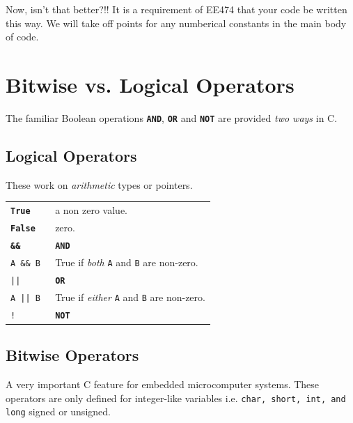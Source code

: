 \documentclass{article}	%
\begin{document}
Now, isn't that better?!!
It is a requirement of EE474 that
your code be written this way.
We will take off points for
any numberical constants in the main body of code.


\section{Bitwise vs. Logical Operators}

The familiar Boolean
operations {\tt\bf AND}, {\tt\bf OR}  and  {\tt\bf NOT}
are provided {\em two ways} in C.


\subsection{Logical Operators}

These work on {\em arithmetic } types or pointers.

\begin{tabular}{l p{1.5in} }

{\tt\bf True}           & a non zero value. \\

{\tt\bf False}          & zero.           \\

{\tt\bf \&\&}           & {\tt\bf AND}     \\

{\tt A \&\& B }         & True if {\it both} {\tt A} and {\tt B} are non-zero. \\

{\tt ||}                &  {\tt\bf OR} \\

{\tt A || B }           &  True if {\it either} {\tt A} and {\tt B} are non-zero.\\

{\tt ! }                &   {\tt\bf NOT} \\

\end{tabular}



\subsection{Bitwise Operators}

A very important C feature for embedded microcomputer systems.
These operators are only defined for integer-like variables i.e.
{\tt char, short, int, and long} signed or unsigned.
\end{document}
